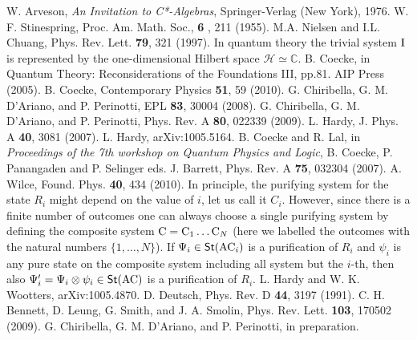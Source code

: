 \documentclass[12pt,aps,pra,showpacs,groupedaddress]{revtex4-1}
\def\spc #1{{\mathscr #1}}
\def\Cmplx{\mathbb C}
\def\rC{{\rm C}}
\def\Stset{{\mathsf{St}}}
\begin{document}
\begin{thebibliography}{99}
 W. Arveson, \emph{An Invitation to C*-Algebras}, Springer-Verlag (New York), 1976.
  W. F. Stinespring, Proc. Am. Math. Soc.,  {\bf 6 }, 211 (1955). 
 M.A. Nielsen and I.L. Chuang, Phys. Rev. Lett. {\bf 79}, 321 (1997).
  In quantum theory the trivial system ${\rm I}$ is represented by the one-dimensional Hilbert space $\spc H \simeq \Cmplx$.
   B. Coecke,  in Quantum Theory: Reconsiderations of the Foundations III, pp.81. AIP Press (2005).
 B. Coecke, Contemporary Physics {\bf 51}, 59 (2010).
 G. Chiribella, G. M. D'Ariano, and P. Perinotti, EPL {\bf 83}, 30004 (2008).
 G. Chiribella, G. M. D'Ariano, and P. Perinotti, Phys. Rev. A {\bf 80}, 022339 (2009).
  L. Hardy, J. Phys. A {\bf 40}, 3081 (2007).
 L. Hardy, arXiv:1005.5164.
 B. Coecke and R. Lal, in {\em Proceedings of the 7th
    workshop on Quantum Physics and Logic}, B. Coecke, P.  Panangaden
  and P.  Selinger eds.
  J. Barrett, Phys. Rev. A {\bf 75},
  032304 (2007). 
   A. Wilce, Found. Phys.  {\bf 40}, 434 (2010).
 In principle, the purifying system for the state $R_{i}$ might depend on
  the value of $i$, let us call it $C_i$.   However,   since  there is a finite number of outcomes one can always choose a
  single purifying system by defining the composite system $\rC = \rC_1 \dots \rC_{N}$ (here we labelled the outcomes with the natural numbers  $\{1, \dots, N\}$).  If
  $\Psi_{i} \in \Stset(\rA\rC_i)$ is a purification of $R_{i}$ and $\psi_{i} $ is any pure state on
  the composite system including all system but the $i$-th, then also $\Psi_{i}' = \Psi_{i} \otimes
  \psi_{i} \in \Stset(\rA\rC)$ is a purification of $R_i$.
   L. Hardy and W. K. Wootters,  arXiv:1005.4870.
   D. Deutsch, Phys. Rev. D {\bf 44}, 3197 (1991).
   C. H. Bennett, D. Leung, G. Smith, and J. A. Smolin,
   Phys. Rev. Lett. {\bf 103}, 170502 (2009).
     G. Chiribella, G. M. D'Ariano, and P. Perinotti, in preparation. 
  \end{thebibliography}
\end{document}
